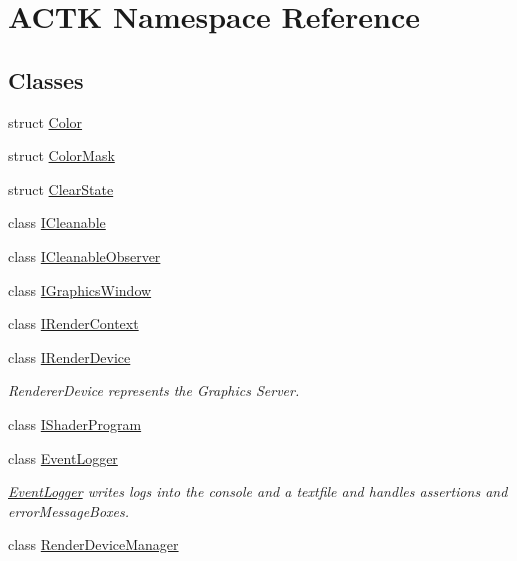 \hypertarget{namespace_a_c_t_k}{\section{A\-C\-T\-K Namespace Reference}
\label{namespace_a_c_t_k}
}
\subsection*{Classes}
\begin{DoxyCompactItemize}
\item 
struct \hyperlink{struct_a_c_t_k_1_1_color}{Color}
\item 
struct \hyperlink{struct_a_c_t_k_1_1_color_mask}{Color\-Mask}
\item 
struct \hyperlink{struct_a_c_t_k_1_1_clear_state}{Clear\-State}
\item 
class \hyperlink{class_a_c_t_k_1_1_i_cleanable}{I\-Cleanable}
\item 
class \hyperlink{class_a_c_t_k_1_1_i_cleanable_observer}{I\-Cleanable\-Observer}
\item 
class \hyperlink{class_a_c_t_k_1_1_i_graphics_window}{I\-Graphics\-Window}
\item 
class \hyperlink{class_a_c_t_k_1_1_i_render_context}{I\-Render\-Context}
\item 
class \hyperlink{class_a_c_t_k_1_1_i_render_device}{I\-Render\-Device}
\begin{DoxyCompactList}\small\item\em Renderer\-Device represents the Graphics Server. \end{DoxyCompactList}\item 
class \hyperlink{class_a_c_t_k_1_1_i_shader_program}{I\-Shader\-Program}
\item 
class \hyperlink{class_a_c_t_k_1_1_event_logger}{Event\-Logger}
\begin{DoxyCompactList}\small\item\em \hyperlink{class_a_c_t_k_1_1_event_logger}{Event\-Logger} writes logs into the console and a textfile and handles assertions and error\-Message\-Boxes. \end{DoxyCompactList}\item 
class \hyperlink{class_a_c_t_k_1_1_render_device_manager}{Render\-Device\-Manager}
\end{DoxyCompactItemize}
